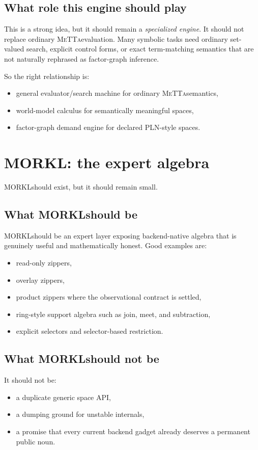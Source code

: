 \documentclass[11pt]{article}
\newcommand{\MeTTa}{\textsc{MeTTa}}
\newcommand{\MORKL}{\textsc{MORKL}}
\begin{document}
\subsection{What role this engine should play}
This is a strong idea, but it should remain a \emph{specialized engine}. It should not replace ordinary \MeTTa evaluation. Many symbolic tasks need ordinary set-valued search, explicit control forms, or exact term-matching semantics that are not naturally rephrased as factor-graph inference.

So the right relationship is:
\begin{itemize}
    \item general evaluator/search machine for ordinary \MeTTa semantics,
    \item world-model calculus for semantically meaningful spaces,
    \item factor-graph demand engine for declared PLN-style spaces.
\end{itemize}

\section{\MORKL: the expert algebra}
\MORKL should exist, but it should remain small.

\subsection{What \MORKL should be}
\MORKL should be an expert layer exposing backend-native algebra that is genuinely useful and mathematically honest. Good examples are:
\begin{itemize}
    \item read-only zippers,
    \item overlay zippers,
    \item product zippers where the observational contract is settled,
    \item ring-style support algebra such as join, meet, and subtraction,
    \item explicit selectors and selector-based restriction.
\end{itemize}

\subsection{What \MORKL should not be}
It should not be:
\begin{itemize}
    \item a duplicate generic space API,
    \item a dumping ground for unstable internals,
    \item a promise that every current backend gadget already deserves a permanent public noun.
\end{itemize}
\end{document}

